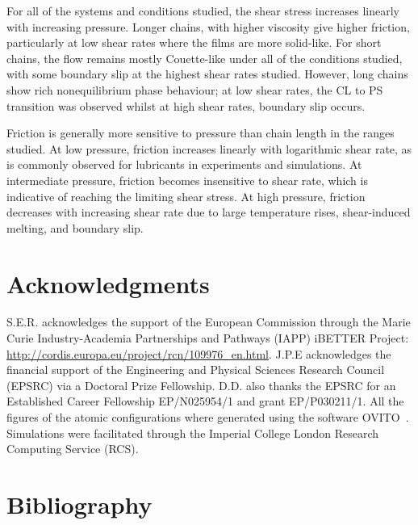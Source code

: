 \documentclass[5p]{elsarticle}
\begin{document}
For all of the systems and conditions studied, the shear stress increases linearly with increasing pressure. Longer chains, with higher viscosity give higher friction, particularly at low shear rates where the films are more solid-like. For short chains, the flow remains mostly Couette-like under all of the conditions studied, with some boundary slip at the highest shear rates studied. However, long chains show rich nonequilibrium phase behaviour; at low shear rates, the CL to PS transition was observed whilst at high shear rates, boundary slip occurs.

Friction is generally more sensitive to pressure than chain length in the ranges studied. At low pressure, friction increases linearly with logarithmic shear rate, as is commonly observed for lubricants in experiments and simulations. At intermediate pressure, friction becomes insensitive to shear rate, which is indicative of reaching the limiting shear stress. At high pressure, friction decreases with increasing shear rate due to large temperature rises, shear-induced melting, and boundary slip.

\section*{Acknowledgments}

S.E.R. acknowledges the support of the European Commission through the Marie Curie Industry-Academia Partnerships and Pathways (IAPP) iBETTER Project: \url{http://cordis.europa.eu/project/rcn/109976_en.html}. J.P.E acknowledges the financial support of the Engineering and Physical Sciences Research Council (EPSRC) via a Doctoral Prize Fellowship. D.D. also thanks the EPSRC for an Established Career Fellowship EP/N025954/1 and grant EP/P030211/1. All the figures of the atomic configurations where generated using the software OVITO~\cite{Stukowski2010b}. Simulations were facilitated through the Imperial College London Research Computing Service (RCS).


\section*{Bibliography}


%
%

\end{document}
